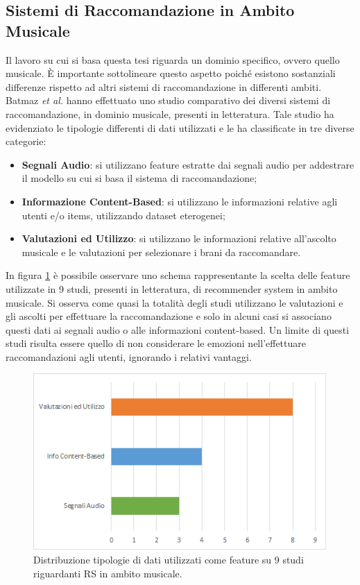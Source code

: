 \documentclass[11pt]{report}
\begin{document}
\subsection{Sistemi di Raccomandazione in Ambito Musicale}

Il lavoro su cui si basa questa tesi riguarda un dominio specifico, ovvero quello musicale. È importante sottolineare questo aspetto poiché esistono sostanziali differenze rispetto ad altri sistemi di raccomandazione in differenti ambiti.
Batmaz \textit{et al.} \cite{deep-re-sys-survey} hanno effettuato uno studio comparativo dei diversi sistemi di raccomandazione, in dominio musicale, presenti in letteratura. Tale studio ha evidenziato le tipologie differenti di dati utilizzati e le ha classificate in tre diverse categorie: 
\begin{itemize}
    \item \textbf{Segnali Audio}: si utilizzano feature estratte dai segnali audio per addestrare il modello su cui si basa il sistema di raccomandazione;
    
    \item \textbf{Informazione Content-Based}: si utilizzano le informazioni relative agli utenti e/o items, utilizzando dataset eterogenei;
    
    \item \textbf{Valutazioni ed Utilizzo}: si utilizzano le informazioni relative all'ascolto musicale e le valutazioni per selezionare i brani da raccomandare.
\end{itemize}
In figura \ref{fig:musical-RS} è possibile osservare uno schema rappresentante la scelta delle feature utilizzate in 9 studi, presenti in letteratura, di recommender system in ambito musicale. Si osserva come quasi la totalità degli studi utilizzano le valutazioni e gli ascolti per effettuare la raccomandazione e solo in alcuni casi si associano questi dati ai segnali audio o alle informazioni content-based. Un limite di questi studi risulta essere quello di non considerare le emozioni nell'effettuare raccomandazioni agli utenti, ignorando i relativi vantaggi.

\vspace{1cm}

\begin{figure}[h!]
	 	\centering
	 	\includegraphics[scale = 0.95]{img/survery-RS.png}
	 	\caption{Distribuzione tipologie di dati utilizzati come feature su 9 studi riguardanti RS in ambito musicale.\cite{deep-re-sys-survey}}
	 	\label{fig:musical-RS}
\end{figure}
\end{document}
